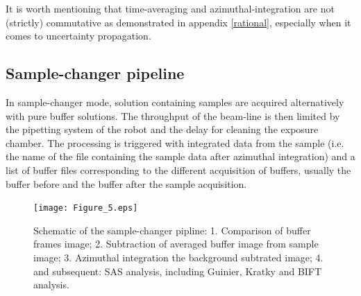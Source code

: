 \documentclass[preprint]{iucr}              %
\begin{document}
It is worth mentioning that time-averaging and azimuthal-integration are not (strictly) commutative as demonstrated in appendix \ref{rational}, especially when it comes to uncertainty propagation.


\subsection{Sample-changer pipeline}
\label{sc-pipeline}
In sample-changer mode, solution containing samples are acquired alternatively with pure buffer solutions.
The throughput of the beam-line is then limited by the pipetting system of the robot and the delay for cleaning the exposure chamber.  
The processing is triggered with integrated data from the sample (i.e. the name of the file containing the sample data after azimuthal integration) and a list of 
buffer files corresponding to the different acquisition of buffers, usually the buffer before and the buffer after the sample acquisition.

\begin{figure}
\label{samplechanger_worflow}
\texttt{[image: Figure\_5.eps]}
\caption{Schematic of the sample-changer pipline: 
1. Comparison of buffer frames image;
2. Subtraction of averaged buffer image from sample image;
3. Azimuthal integration the background subtrated image;
4. and subsequent: SAS analysis, including Guinier, Kratky and BIFT analysis.}
\end{figure}
\end{document}
